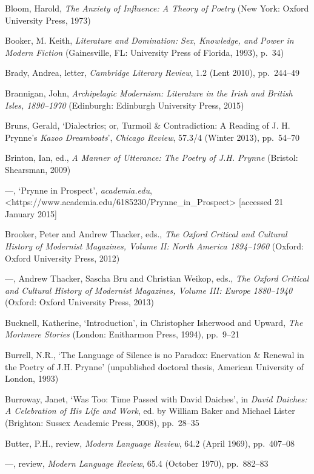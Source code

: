 \documentclass[]{article}
\begin{document}
Bloom, Harold, \emph{The Anxiety of Influence: A Theory of Poetry} (New
York: Oxford University Press, 1973)

Booker, M. Keith, \emph{Literature and Domination: Sex, Knowledge, and
Power in Modern Fiction} (Gainesville, FL: University Press of Florida,
1993), p.~34)

Brady, Andrea, letter, \emph{Cambridge Literary Review}, 1.2 (Lent
2010), pp.~244--49

Brannigan, John, \emph{Archipelagic Modernism: Literature in the Irish
and British Isles, 1890--1970} (Edinburgh: Edinburgh University Press,
2015)

Bruns, Gerald, `Dialectrics; or, Turmoil \& Contradiction: A Reading of
J. H. Prynne's \emph{Kazoo Dreamboats}', \emph{Chicago Review}, 57.3/4
(Winter 2013), pp.~54--70

Brinton, Ian, ed., \emph{A Manner of Utterance: The Poetry of J.H.
Prynne} (Bristol: Shearsman, 2009)

---, `Prynne in Prospect', \emph{academia.edu},\\
\textless{}https://www.academia.edu/6185230/Prynne\_in\_Prospect\textgreater{}
{[}accessed 21 January 2015{]}

Brooker, Peter and Andrew Thacker, eds., \emph{The Oxford Critical and
Cultural History of Modernist Magazines, Volume II: North America
1894--1960} (Oxford: Oxford University Press, 2012)

---, Andrew Thacker, Sascha Bru and Christian Weikop, eds., \emph{The
Oxford Critical and Cultural History of Modernist Magazines, Volume III:
Europe 1880--1940} (Oxford: Oxford University Press, 2013)

Bucknell, Katherine, `Introduction', in Christopher Isherwood and
Upward, \emph{The Mortmere Stories} (London: Enitharmon Press, 1994),
pp.~9--21

Burrell, N.R., `The Language of Silence is no Paradox: Enervation \&
Renewal in the Poetry of J.H. Prynne' (unpublished doctoral thesis,
American University of London, 1993)

Burroway, Janet, `Was Too: Time Passed with David Daiches', in
\emph{David Daiches: A Celebration of His Life and Work}, ed. by William
Baker and Michael Lister (Brighton: Sussex Academic Press, 2008),
pp.~28--35

Butter, P.H., review, \emph{Modern Language Review}, 64.2 (April 1969),
pp.~407--08

---, review, \emph{Modern Language Review}, 65.4 (October 1970),
pp.~882--83
\end{document}
